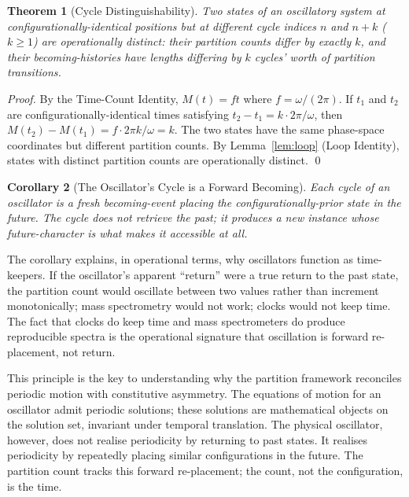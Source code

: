 \documentclass[twocolumn,10pt,a4paper]{article}
\newtheorem{theorem}{Theorem}[section]
\newtheorem{corollary}[theorem]{Corollary}
\theoremstyle{definition}
\theoremstyle{remark}
\newcommand{\Mcount}{M}
\begin{document}
\begin{theorem}[Cycle Distinguishability]
\label{thm:cycle-distinguishability}
Two states of an oscillatory system at configurationally-identical positions but at different cycle indices $n$ and $n+k$ ($k \geq 1$) are operationally distinct: their partition counts differ by exactly $k$, and their becoming-histories have lengths differing by $k$ cycles' worth of partition transitions.
\end{theorem}

\begin{proof}
By the Time-Count Identity, $\Mcount(t) = ft$ where $f = \omega/(2\pi)$. If $t_1$ and $t_2$ are configurationally-identical times satisfying $t_2 - t_1 = k \cdot 2\pi/\omega$, then $\Mcount(t_2) - \Mcount(t_1) = f \cdot 2\pi k / \omega = k$. The two states have the same phase-space coordinates but different partition counts. By Lemma~\ref{lem:loop} (Loop Identity), states with distinct partition counts are operationally distinct. \qed
\end{proof}

\begin{corollary}[The Oscillator's Cycle is a Forward Becoming]
\label{cor:oscillator-forward}
Each cycle of an oscillator is a fresh becoming-event placing the configurationally-prior state in the future. The cycle does not retrieve the past; it produces a new instance whose future-character is what makes it accessible at all.
\end{corollary}

The corollary explains, in operational terms, why oscillators function as time-keepers. If the oscillator's apparent ``return'' were a true return to the past state, the partition count would oscillate between two values rather than increment monotonically; mass spectrometry would not work; clocks would not keep time. The fact that clocks do keep time and mass spectrometers do produce reproducible spectra is the operational signature that oscillation is forward re-placement, not return.

This principle is the key to understanding why the partition framework reconciles periodic motion with constitutive asymmetry. The equations of motion for an oscillator admit periodic solutions; these solutions are mathematical objects on the solution set, invariant under temporal translation. The physical oscillator, however, does not realise periodicity by returning to past states. It realises periodicity by repeatedly placing similar configurations in the future. The partition count tracks this forward re-placement; the count, not the configuration, is the time.
\end{document}
